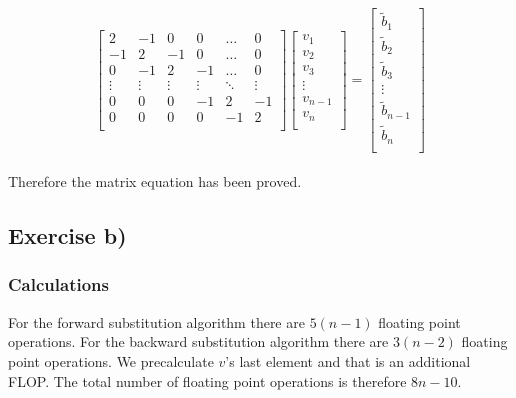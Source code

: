 \documentclass{article}
\begin{document}
  \begin{equation*} \label{full matrix-equation}
    \begin{bmatrix}
      2 & -1 & 0 & 0 & \dots & 0 \\
      -1 & 2 & -1 & 0 & \dots & 0 \\
      0 & -1 & 2 & -1 & \dots & 0 \\
      \vdots & \vdots & \vdots & \vdots & \ddots & \vdots \\
      0 & 0 & 0 & -1 & 2 & -1 \\
      0 & 0 & 0 & 0 & -1 & 2 \\
    \end{bmatrix}
    \begin{bmatrix}
      v_1 \\
      v_2 \\
      v_3 \\
      \vdots \\
      v_{n-1} \\
      v_n \\
    \end{bmatrix}
    =
    \begin{bmatrix}
      \tilde{b}_1 \\
      \tilde{b}_2 \\
      \tilde{b}_3 \\
      \vdots \\
      \tilde{b}_{n-1} \\
      \tilde{b}_n \\
    \end{bmatrix}
  \end{equation*} \\

  Therefore the matrix equation has been proved. \\

\subsection{Exercise b)} \label{Method b)}

  \subsubsection{Calculations}

    For the forward substitution algorithm there are $5(n-1)$ floating point operations. For the backward substitution algorithm there are $3(n-2)$ floating point operations. We precalculate $v$'s last element and that is an additional FLOP. The total number of floating point operations is therefore $8n - 10$. \\
\end{document}
